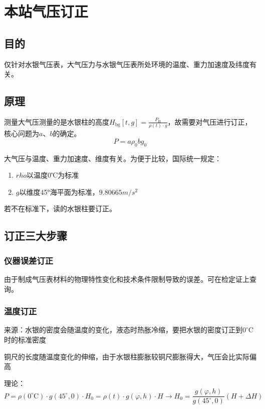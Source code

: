 \documentclass[UTF8,11pt]{ctexbook}
\begin{document}
\section{本站气压订正}

\subsection{目的}

仅针对水银气压表，大气压力与水银气压表所处环境的温度、重力加速度及纬度有关。

\subsection{原理}

测量大气压测量的是水银柱的高度\(H_\mathrm{bg}[t,g]=\frac{P_\mathrm{H}}{\rho(t)\cdot g}\)，故需要对气压进行订正，核心问题为\(a\)、\(b\)的确定。
\[
P=a\rho_0bg_0
\]

大气压与温度、重力加速度、维度有关。为便于比较，国际统一规定：
\begin{enumerate}
    \item \(rho\)以温度0℃为标准
    \item \(g\)以维度45°海平面为标准，\(9.80665m/s^2\)
\end{enumerate}

若不在标准下，读的水银柱要订正。

\subsection{订正三大步骤}

\subsubsection{仪器误差订正}

由于制成气压表材料的物理特性变化和技术条件限制导致的误差。可在检定证上查询。

\subsubsection{温度订正}

来源：水银的密度会随温度的变化，液态时热胀冷缩，要把水银的密度订正到\(0^\circ\mathrm{C}\)时的标准密度

铜尺的长度随温度变化的伸缩，由于水银柱膨胀较铜尺膨胀得大，气压会比实际偏高

理论：
\[
P=\rho(0^\circ\mathrm{C})\cdot g(45^\circ,0)\cdot H_0=\rho(t)\cdot g(\varphi,h)\cdot H\rightarrow H_0=\frac{g(\varphi,h)}{g(45^\circ,0)}(H+\Delta H)
\]
\end{document}
